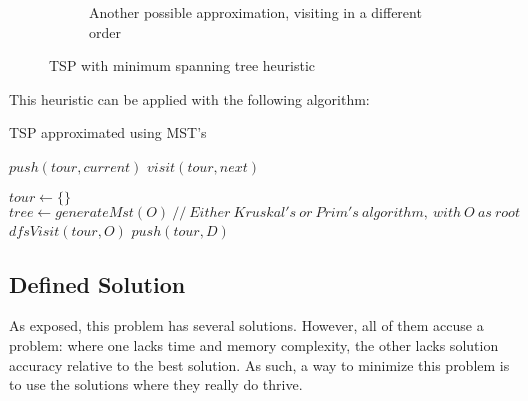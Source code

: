 \documentclass[a4paper, 12pt]{report}
\begin{document}
\begin{figure}[h]
\begin{subfigure}[b]{0.45\textwidth}
            \caption{Another possible approximation, visiting in a different order}
        \end{subfigure}

        \caption{TSP with minimum spanning tree heuristic}
        \label{fig:tspmst}
    \end{figure}
    
    \pagebreak
    
    This heuristic can be applied with the following algorithm:
    
      \begin{algorithm}
    	\caption{TSP approximated using MST's} 
	    \begin{algorithmic}[1]
	    
            \State $push(tour, current)$
                \State $visit(tour, next)$
    	    \EndFor
	    \EndFunction

	    \State $tour \leftarrow \{\}$
        \State $tree \leftarrow generateMst(O) \ // \ Either\ Kruskal's\ or\ Prim's\ algorithm,\ with\ O\ as\ root$ 
        \State $dfsVisit(tour, O)$
        \State $push(tour, D)$
		
	    \end{algorithmic} 
	\end{algorithm}
    
     \subsection{Defined Solution} \label{solution}
    
    As exposed, this problem has several solutions. However, all of them accuse a problem: where one lacks time and memory complexity, the other lacks solution accuracy relative to the best solution. As such, a way to minimize this problem is to use the solutions where they really do thrive.
    
\end{document}
